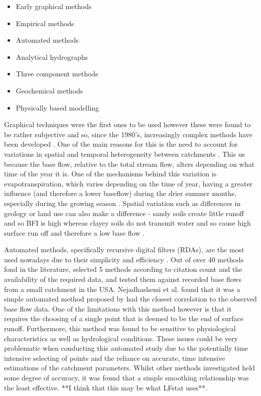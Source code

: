 \documentclass[DIV=calc, paper=a4, fontsize=11pt, twocolumn]{scrartcl}	 %
\begin{document}
\begin{itemize}
	\item Early graphical methods
	\item Empirical methods
	\item Automated methods
	\item Analytical hydrographs
	\item Three component methods
	\item Geochemical methods
	\item Physically based modelling
\end{itemize}

Graphical techniques were the first ones to be used however these were found to be rather subjective and so, since the 1980's, increasingly complex methods have been developed \citet{Li2013}. One of the main reasons for this is the need to account for variations in spatial and temporal heterogeneity between catchments \citep{Tallaksen1995}. This us because the base flow, relative to the total stream flow, alters depending on what time of the year it is. One of the mechanisms behind this variation is evapotranspiration, which varies depending on the time of year, having a greater influence (and therefore a lower baseflow) during the drier summer months, especially during the growing season \citep{Tallaksen1995}. Spatial variation such as differences in geology or land use can also make a difference - sandy soils create little runoff and so BFI is high whereas clayey soils do not transmit water and so cause high surface run off and therefore a low base flow \citep{Li2013}.

 Automated methods, specifically recursive digital filters (RDAs), are the most used nowadays due to their simplicity and efficiency \citet{Li2013}. Out of over 40 methods fond in the literature, \citet{Nejadhashemi2009} selected 5 methods according to citation count and the availability of the required data, and tested them against recorded base flows from a small catchment in the USA.  Nejadhashemi et al. found that it was a simple automated method proposed by \citet{Boughton1988} had the closest correlation to the observed base flow data. One of the limitations with this method however is that it requires the choosing of a single point that is deemed to be the end of surface runoff. Furthermore, this method was found to be sensitive to physiological characteristics as well as hydrological conditions. These issues could be very problematic when conducting this automated study due to the potentially time intensive selecting of points and the reliance on accurate, time intensive estimations of the catchment parameters. Whilst other methods investigated held some degree of accuracy, it was found that a simple smoothing relationship was the least effective. **I think that this may be what LFstat uses**.
\end{document}

